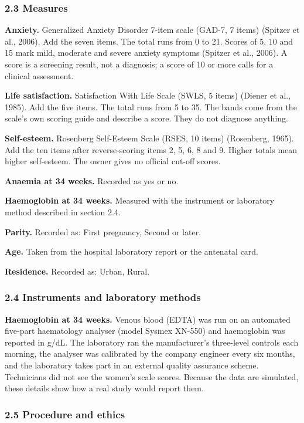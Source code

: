 \documentclass[12pt]{article}
\begin{document}
\subsubsection{2.3 Measures}

\textbf{Anxiety.} Generalized Anxiety Disorder 7-item scale (GAD-7, 7 items) (Spitzer et al., 2006). Add the seven items. The total runs from 0 to 21. Scores of 5, 10 and 15 mark mild, moderate and severe anxiety symptoms (Spitzer et al., 2006). A score is a screening result, not a diagnosis; a score of 10 or more calls for a clinical assessment.

\textbf{Life satisfaction.} Satisfaction With Life Scale (SWLS, 5 items) (Diener et al., 1985). Add the five items. The total runs from 5 to 35. The bands come from the scale's own scoring guide and describe a score. They do not diagnose anything.

\textbf{Self-esteem.} Rosenberg Self-Esteem Scale (RSES, 10 items) (Rosenberg, 1965). Add the ten items after reverse-scoring items 2, 5, 6, 8 and 9. Higher totals mean higher self-esteem. The owner gives no official cut-off scores.

\textbf{Anaemia at 34 weeks.} Recorded as yes or no.

\textbf{Haemoglobin at 34 weeks.} Measured with the instrument or laboratory method described in section 2.4.

\textbf{Parity.} Recorded as: First pregnancy, Second or later.

\textbf{Age.} Taken from the hospital laboratory report or the antenatal card.

\textbf{Residence.} Recorded as: Urban, Rural.

\subsubsection{2.4 Instruments and laboratory methods}

\textbf{Haemoglobin at 34 weeks.} Venous blood (EDTA) was run on an automated five-part haematology analyser (model Sysmex XN-550) and haemoglobin was reported in g/dL. The laboratory ran the manufacturer's three-level controls each morning, the analyser was calibrated by the company engineer every six months, and the laboratory takes part in an external quality assurance scheme. Technicians did not see the women's scale scores. Because the data are simulated, these details show how a real study would report them.

\subsubsection{2.5 Procedure and ethics}
\end{document}
